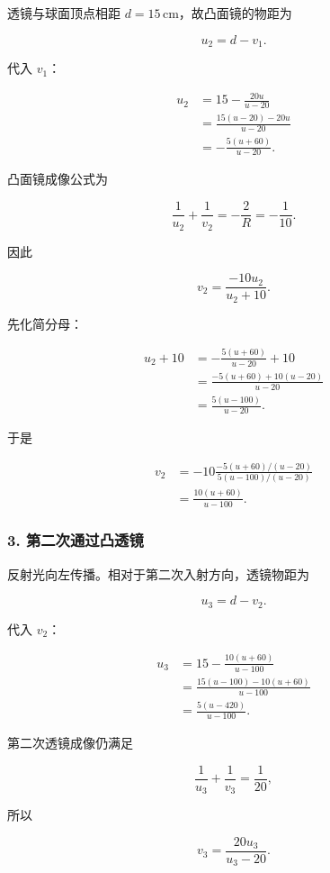 \documentclass[12pt,a4paper,UTF8]{ctexart}
\begin{document}
透镜与球面顶点相距 \(d=15\,\mathrm{cm}\)，故凸面镜的物距为

\[
u_2=d-v_1.
\]

代入 \(v_1\)：

\[
\begin{aligned}
u_2
&=15-\frac{20u}{u-20}\\
&=\frac{15(u-20)-20u}{u-20}\\
&=-\frac{5(u+60)}{u-20}.
\end{aligned}
\]

凸面镜成像公式为

\[
\frac{1}{u_2}+\frac{1}{v_2}=-\frac{2}{R}=-\frac{1}{10}.
\]

因此

\[
v_2=\frac{-10u_2}{u_2+10}.
\]

先化简分母：

\[
\begin{aligned}
u_2+10
&=-\frac{5(u+60)}{u-20}+10\\
&=\frac{-5(u+60)+10(u-20)}{u-20}\\
&=\frac{5(u-100)}{u-20}.
\end{aligned}
\]

于是

\[
\begin{aligned}
v_2
&=-10\frac{-5(u+60)/(u-20)}{5(u-100)/(u-20)}\\
&=\frac{10(u+60)}{u-100}.
\end{aligned}
\]

\subsubsection{3.
第二次通过凸透镜}\label{ux7b2cux4e8cux6b21ux901aux8fc7ux51f8ux900fux955c}

反射光向左传播。相对于第二次入射方向，透镜物距为

\[
u_3=d-v_2.
\]

代入 \(v_2\)：

\[
\begin{aligned}
u_3
&=15-\frac{10(u+60)}{u-100}\\
&=\frac{15(u-100)-10(u+60)}{u-100}\\
&=\frac{5(u-420)}{u-100}.
\end{aligned}
\]

第二次透镜成像仍满足

\[
\frac{1}{u_3}+\frac{1}{v_3}=\frac{1}{20},
\]

所以

\[
v_3=\frac{20u_3}{u_3-20}.
\]
\end{document}
